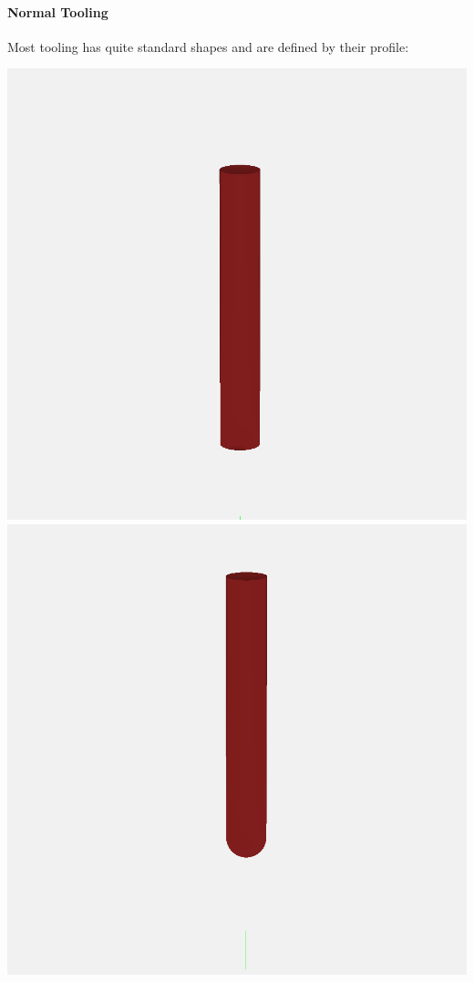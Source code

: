 \documentclass{ltxdoc}
\begin{document}
\begin{samepage}
\paragraph{Normal Tooling}

\label{para:normaltooling} Most tooling has quite standard shapes 
and are defined by their profile:

  \noindent\includegraphics[width=\linewidth/3]{images/tool_square_201.png}%
           \includegraphics[width=\linewidth/3]{images/tool_ball_202.png}%

\end{samepage}
\end{document}
